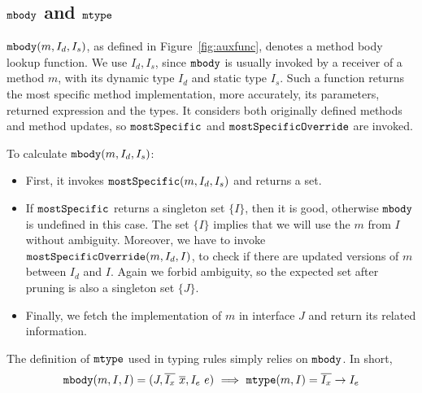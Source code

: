 \subsection{$\texttt{mbody}$ and $\texttt{mtype}$}

$\texttt{mbody}(m, I_d, I_s)$, as defined in Figure~\ref{fig:auxfunc}, denotes a method body lookup function.
We use $I_d, I_s$, since $\texttt{mbody}$ is usually invoked by a receiver of a method $m$, with its dynamic
type $I_d$ and static type $I_s$. Such a function returns the most specific method implementation, more
accurately, its parameters, returned expression and the types. It considers both originally defined methods and method updates, so $\texttt{mostSpecific}$ and $\texttt{mostSpecificOverride}$ are invoked.

To calculate $\texttt{mbody}(m, I_d, I_s)$:
\begin{itemize}
    \item First, it invokes $\texttt{mostSpecific}(m, I_d, I_s)$ and returns a set.
    \item If $\texttt{mostSpecific}$ returns a singleton set $\{I\}$, then it is good, otherwise $\texttt{mbody}$ is undefined in
    this case. The set $\{I\}$ implies that we will use the $m$ from $I$ without ambiguity. Moreover, we have to invoke $\texttt{mostSpecificOverride}(m, I_d, I)$, to check if there are updated versions of $m$ between $I_d$ and $I$. Again we forbid ambiguity, so the expected set after pruning is also a singleton set $\{J\}$.
    \item Finally, we fetch the implementation of $m$ in interface $J$ and return its related information.
\end{itemize}
The definition of $\texttt{mtype}$ used in typing rules simply relies on $\texttt{mbody}$. In short,
$$\texttt{mbody}(m, I, I) = (J, \overline{I_x}\ \overline{x}, I_e\ e) \ \Longrightarrow\ \texttt{mtype}(m, I) = \overline{I_x}\rightarrow I_e$$

